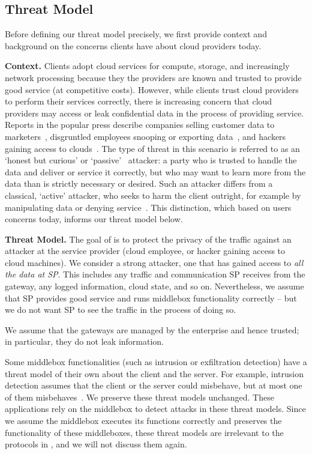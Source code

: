 \subsection{Threat Model}

Before defining our threat model precisely, we first provide context and background on the concerns clients have about cloud providers today.

{\bf Context.} 
  Clients adopt cloud services for compute, storage, and increasingly network processing because they the providers are known and trusted to provide good service (at competitive costs). 
  However, while clients trust cloud providers to perform their services correctly, there is increasing concern that cloud providers may access or leak confidential data in the process of providing service.
  Reports in the popular press describe companies selling customer data to marketers~\cite{example}, disgruntled employees snooping or exporting data~\cite{something}, and hackers gaining access to clouds~\cite{somethingelse}.
  The type of threat in this scenario is referred to as an `honest but curious' or `passive'~\cite{goodrich} attacker: a party who is trusted to handle the data and deliver or service it correctly, but who may want to learn more from the data than is strictly necessary or desired.
  Such an attacker differs from a classical, `active' attacker, who seeks to harm the client outright, for example by manipulating data or denying service~\cite{goodrich}.
  This distinction, which based on users concerns today, informs our threat model below. 

{\bf Threat Model.}
The goal of \sys is to protect the privacy of the traffic against an attacker at the service provider  
(cloud employee, or hacker gaining access to cloud machines). 
We consider a strong  attacker, one that has gained access to {\em all the data at SP}.
This includes any traffic and communication SP receives from the 
gateway, any logged information, cloud state, and so on. Nevertheless, we assume that 
SP provides good service and runs middlebox functionality correctly -- but we do not want SP to 
see the traffic in the process of doing so.  

We assume that the gateways are managed by the enterprise and hence trusted; in particular,  they do not leak information.


Some middlebox functionalities (such as intrusion or exfiltration detection) have a threat model
of their own about the client and the server. For example, intrusion detection assumes that 
the client or the server could misbehave, but at most one of them misbehaves~\cite{Bro}.  
We preserve these threat models unchanged. These applications rely
on the middlebox to detect attacks in these threat models. Since we assume the middlebox executes
its functions correctly and \sys preserves the functionality of these middleboxes, 
these threat models are irrelevant to the protocols in \sys, and we will not discuss them again. 

